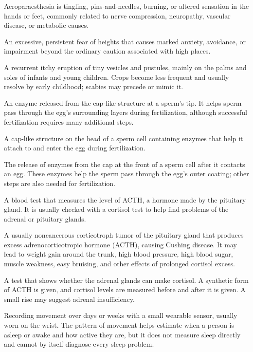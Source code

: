  Acroparaesthesia is tingling, pins-and-needles, burning, or altered sensation in the hands or feet, commonly related to nerve compression, neuropathy, vascular disease, or metabolic causes.

 An excessive, persistent fear of heights that causes marked anxiety, avoidance, or impairment beyond the ordinary caution associated with high places.

 A recurrent itchy eruption of tiny vesicles and pustules, mainly on the palms and soles of infants and young children. Crops become less frequent and usually resolve by early childhood; scabies may precede or mimic it.

 An enzyme released from the cap-like structure at a sperm’s tip. It helps sperm pass through the egg’s surrounding layers during fertilization, although successful fertilization requires many additional steps.

 A cap-like structure on the head of a sperm cell containing enzymes that help it attach to and enter the egg during fertilization.

 The release of enzymes from the cap at the front of a sperm cell after it contacts an egg. These enzymes help the sperm pass through the egg’s outer coating; other steps are also needed for fertilization.

 A blood test that measures the level of ACTH, a hormone made by
the pituitary gland. It is usually checked with a cortisol test to help find problems
of the adrenal or pituitary glands.

 A usually noncancerous corticotroph tumor of the pituitary gland that produces excess adrenocorticotropic hormone (ACTH), causing Cushing disease. It may lead to weight gain around the trunk, high blood pressure, high blood sugar, muscle weakness, easy bruising, and other effects of prolonged cortisol excess.

 A test that shows whether the adrenal glands can make
cortisol. A synthetic form of ACTH is given, and cortisol levels are measured before
and after it is given. A small rise may suggest adrenal insufficiency.

 Recording movement over days or weeks with a small wearable sensor, usually worn on the wrist. The pattern of movement helps estimate when a person is asleep or awake and how active they are, but it does not measure sleep directly and cannot by itself diagnose every sleep problem.

